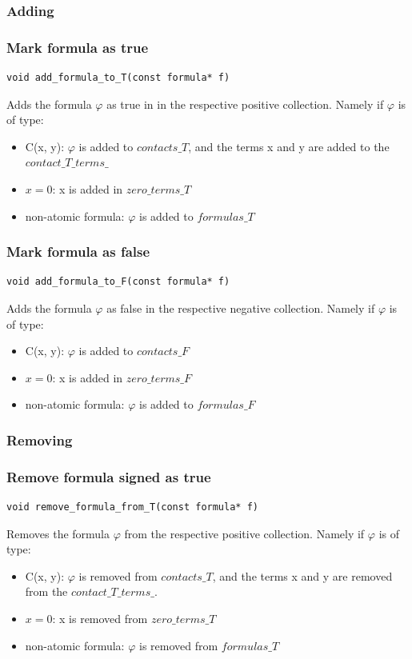 \documentclass{article}
\begin{document}
	\subsubsection*{Adding}
	\subsubsection*{Mark formula as true}
\begin{lstlisting}
void add_formula_to_T(const formula* f)
\end{lstlisting}
	Adds the formula $\varphi$ as true in in the respective positive collection. Namely if $\varphi$ is of type:
	\begin{itemize}
		\item C(x, y): $\varphi$ is added to $contacts\_T$, and the terms x and y are added to the $contact\_T\_terms\_$
		\item $x = 0$: x is added in $zero\_terms\_T$
		\item non-atomic formula: $\varphi$ is added to $formulas\_T$
	\end{itemize}

	\subsubsection*{Mark formula as false}
\begin{lstlisting}
void add_formula_to_F(const formula* f)
\end{lstlisting}
	Adds the formula $\varphi$ as false in the respective negative collection. Namely if $\varphi$ is of type:
	\begin{itemize}
		\item C(x, y): $\varphi$ is added to $contacts\_F$
		\item $x = 0$: x is added in $zero\_terms\_F$
		\item non-atomic formula: $\varphi$ is added to $formulas\_F$
	\end{itemize}

	\subsubsection*{Removing}
	\subsubsection*{Remove formula signed as true}
\begin{lstlisting}
void remove_formula_from_T(const formula* f)
\end{lstlisting}
	Removes the formula $\varphi$ from the respective positive collection. Namely if $\varphi$ is of type:
	\begin{itemize}
		\item C(x, y): $\varphi$ is removed from $contacts\_T$, and the terms x and y are removed from the $contact\_T\_terms\_$.
		\item $x = 0$: x is removed from $zero\_terms\_T$
		\item non-atomic formula: $\varphi$ is removed from $formulas\_T$
	\end{itemize}
\end{document}
